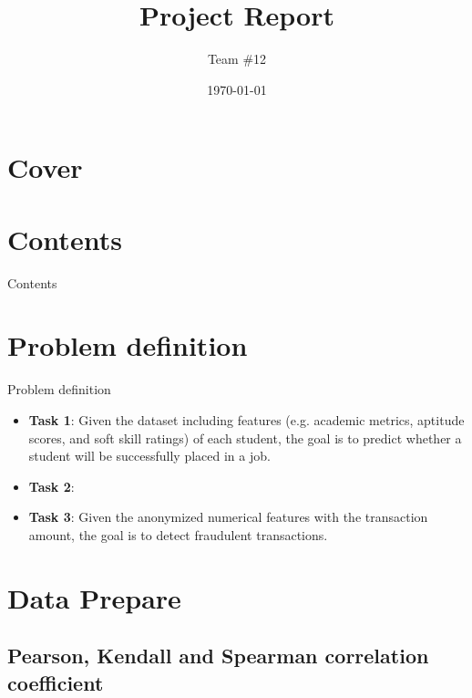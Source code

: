 \documentclass{beamer}
\title{Project Report}
\author{Team \#12}
\institute{
  \parbox{0.2\textwidth}{
    \centering WANG Zeyu
    \vspace{.25cm}
  }
  \parbox{0.2\textwidth}{
    \centering YANG Xirui
    \vspace{.25cm}
  }
  \parbox{0.2\textwidth}{
    \centering Wu Tianxiao
    \vspace{.25cm}
  }
}
\date{\today}
\begin{document}
\section*{Cover}
\frame{\titlepage}

\section*{Contents}
\begin{frame}{Contents}
  \tableofcontents
\end{frame}

\section{Problem definition}

\begin{frame}{Problem definition}

  \begin{itemize}
    \item \textbf{Task 1}: Given the dataset including features (e.g. academic metrics, aptitude scores, and soft skill ratings) of each student, the goal is to predict whether a student will be successfully placed in a job.  \vspace{.25cm}
    \item \textbf{Task 2}: \vspace{.25cm} %
    \item \textbf{Task 3}: Given the anonymized numerical features with the transaction amount, the goal is to detect fraudulent transactions. \vspace{.25cm}
  \end{itemize}

\end{frame}

\section{Data Prepare}

\subsection{Pearson, Kendall and Spearman correlation coefficient}
\end{document}
